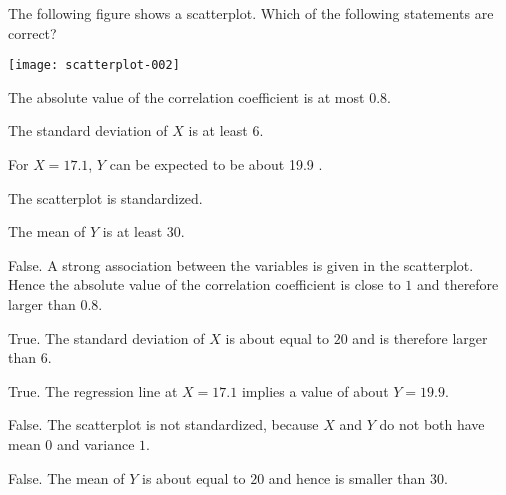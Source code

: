 
\begin{question}
The following figure shows a scatterplot. Which of the
following statements are correct?

\texttt{[image: scatterplot-002]}

\begin{answerlist}
  \item The absolute value of the correlation coefficient is at most $0.8$.
  \item The standard deviation of $X$ is at least $6$.
  \item For $X =  17.1 $, $Y$ can be expected to be about  19.9 .
  \item The scatterplot is standardized.
  \item The mean of $Y$ is at least $30$.
\end{answerlist}
\end{question}

\begin{solution}
\begin{answerlist}
  \item False. A strong association between the variables is given in the scatterplot. Hence the absolute value of the correlation coefficient is close to $1$ and therefore larger than $0.8$.
  \item True. The standard deviation of $X$ is about equal to $ 20 $ and is therefore larger than $6$.
  \item True. The regression line at $X=17.1$ implies a value of about $Y = 19.9$.
  \item False. The scatterplot is not standardized, because $X$ and $Y$ do not both have mean $0$ and variance $1$.
  \item False. The mean of $Y$ is about equal to $ 20 $ and hence is smaller than $30$.
\end{answerlist}
\end{solution}


